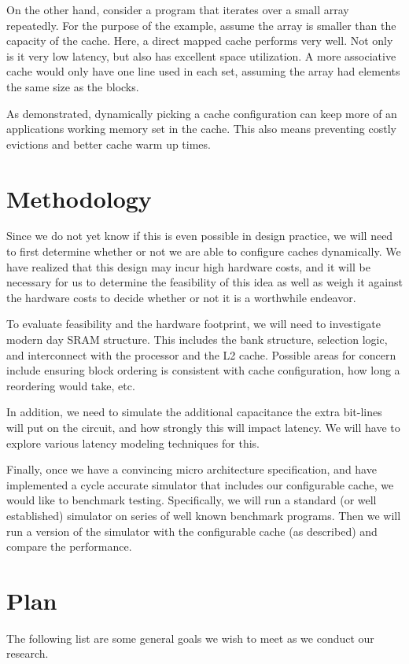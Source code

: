 \documentclass[pageno]{jpaper}
\begin{document}
On the other hand, consider a program that iterates over a small array repeatedly. For the purpose of the example, assume the array is smaller than the capacity of the cache. Here, a direct mapped cache performs very well. Not only is it very low latency, but also has excellent space utilization. A more associative cache would only have one line used in each set, assuming the array had elements  the same size as the blocks.

As demonstrated, dynamically picking a cache configuration can keep more of an applications working memory set in the cache. This also means preventing costly evictions and better cache warm up times.

\section{Methodology}
Since we do not yet know if this is even possible in design practice, we will need to first determine whether or not we are able to configure caches dynamically. We have realized that this design may incur high hardware costs, and it will be necessary for us to determine the feasibility of this idea as well as weigh it against the hardware costs to decide whether or not it is a worthwhile endeavor.

To evaluate feasibility and the hardware footprint, we will need to investigate modern day SRAM structure. This includes the bank structure, selection logic, and interconnect with the processor and the L2 cache. Possible areas for concern include ensuring block ordering is consistent with cache configuration, how long a reordering would take, etc.

In addition, we need to simulate the additional capacitance the extra bit-lines will put on the circuit, and how strongly this will impact latency. We will have to explore various latency modeling techniques for this.

Finally, once we have a convincing micro architecture specification, and have implemented a cycle accurate simulator that includes our configurable cache, we would like to benchmark testing. Specifically, we will run a standard (or well established) simulator on series of well known benchmark programs. Then we will run a version of the simulator with the configurable cache (as described) and compare the performance.

\section{Plan}
The following list are some general goals we wish to meet as we conduct our research.\\
\end{document}
